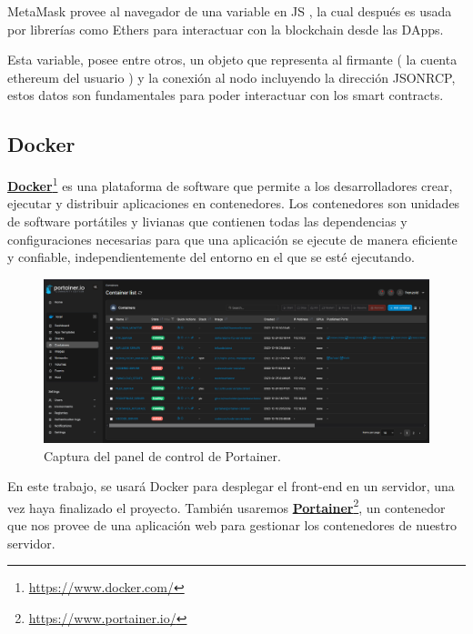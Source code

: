 \bigskip

MetaMask provee al navegador de una variable en JS , la cual después es usada por librerías como Ethers para interactuar con la blockchain desde las DApps.

\bigskip

Esta variable, posee entre otros, un objeto que representa al firmante ( la cuenta ethereum del usuario ) y la conexión al nodo incluyendo la dirección JSONRCP, estos datos son fundamentales para poder interactuar con los smart contracts.

\newpage

\subsection{Docker}

\textcolor{blue}{\href{https://www.docker.com/}{\textbf{Docker}}}\footnote{\url{https://www.docker.com/}} es una plataforma de software que permite a los desarrolladores crear, ejecutar y distribuir aplicaciones en contenedores. Los contenedores son unidades de software portátiles y livianas que contienen todas las dependencias y configuraciones necesarias para que una aplicación se ejecute de manera eficiente y confiable, independientemente del entorno en el que se esté ejecutando.

\begin{figure}[H]
        \centering
        \includegraphics[width=1\textwidth]{img/capturas/portainer.png}
        \caption{Captura del panel de control de Portainer.}
        \label{fig:configApi}
\end{figure}

\bigskip

En este trabajo, se usará Docker para desplegar el front-end en un servidor, una vez haya finalizado el proyecto. También usaremos \textcolor{blue}{\href{https://www.portainer.io/}{\textbf{Portainer}}}\footnote{\url{https://www.portainer.io/}}, un contenedor que nos provee de una aplicación web para gestionar los contenedores de nuestro servidor.